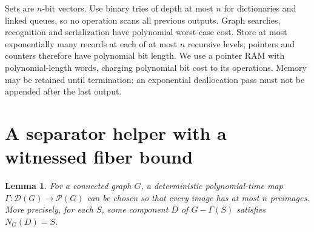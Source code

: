 \documentclass[acmsmall,12pt,screen,nonacm]{acmart}
\newtheorem{lemma}[theorem]{Lemma}
\newcommand{\PMC}{\mathcal P}
\newcommand{\Sep}{\mathcal D}
\begin{document}
Sets are $n$-bit vectors. Use binary tries of depth at most $n$ for dictionaries
and linked queues, so no operation scans all previous outputs. Graph searches,
recognition and serialization have polynomial worst-case cost. Store at most
exponentially many records at each of at most $n$ recursive levels; pointers
and counters therefore have polynomial bit length. We use a pointer RAM with
polynomial-length words, charging polynomial bit cost to its operations.
Memory may be retained until termination: an exponential deallocation pass
must not be appended after the last output.

\section{A separator helper with a witnessed fiber bound}\label{sec:helper}

\begin{lemma}\label{lem:helper}
For a connected graph $G$, a deterministic polynomial-time map
$\Gamma:\Sep(G)\to\PMC(G)$ can be chosen so that every image has at most
$n$ preimages. More precisely, for each $S$, some component $D$ of
$G-\Gamma(S)$ satisfies $N_G(D)=S$.
\end{lemma}
\end{document}
